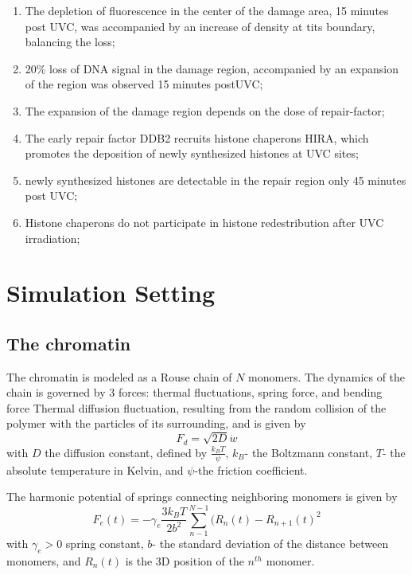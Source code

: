\documentclass[12pt]{report}
\begin{document}
\begin{enumerate}
		\item The depletion of fluorescence in the center of the damage area, 15 minutes post UVC, was accompanied by an increase of density at tits boundary, balancing the loss;
		\item 20\% loss of DNA signal in the damage region, accompanied by an expansion of the region was observed 15 minutes postUVC;
		\item The expansion of the damage region depends on the dose of repair-factor;		
		\item The early repair factor DDB2 recruits histone chaperons HIRA, which promotes the deposition of newly synthesized histones at UVC sites;
		\item newly synthesized histones are detectable in the repair region only 45 minutes post UVC;
		\item Histone chaperons do not participate in histone redestribution after UVC irradiation;
		
	\end{enumerate}
	
	\section{Simulation Setting}
	
	\subsection{The chromatin}
     The chromatin is modeled as a Rouse chain of $N$ monomers. The dynamics of the chain is governed by 3 forces: thermal fluctuations, spring force, and bending force 
     Thermal diffusion fluctuation, resulting from the random collision of the polymer with the particles of its surrounding, and is given by 
     \begin{equation*}
     F_d = \sqrt{2D}\dot{w}
     \end{equation*}
      with $D$ the diffusion constant, defined by $\frac{k_BT}{\psi}$, $k_B$- the Boltzmann constant, $T$- the absolute temperature in Kelvin, and $\psi$-the friction coefficient.
      
     The harmonic potential of springs connecting neighboring monomers is given by
     \begin{equation*}
      F_e(t) = -\gamma_e\frac{3k_BT}{2b^2}\sum_{n-1}^{N-1}(R_n(t)-R_{n+1}(t)^2
     \end{equation*}
     with $\gamma_e>0$ spring constant, $b$- the standard deviation of the distance between monomers, and $R_n(t)$ is the 3D position of the $n^{th}$ monomer.
     
\end{document}
